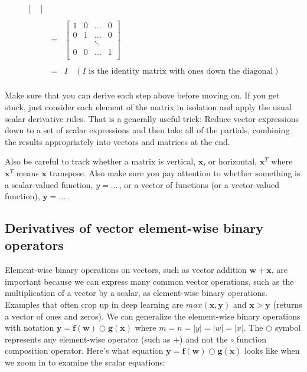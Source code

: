\documentclass[11pt]{article}
\begin{document}
\begin{eqnarray*}
\begin{bmatrix}
\end{bmatrix}\\\\
 & = & \begin{bmatrix}
1 & 0 & \ldots& 0 \\
0 &1 &\ldots & 0 \\
& & \ddots\\
0 & 0 & \ldots &1 \\
\end{bmatrix}\\\\
& = & I ~~~~(I \text{ is the identity matrix with ones down the diagonal})\\
\end{eqnarray*}


Make sure that you can derive each step above before moving on. If you get stuck, just consider each element of the matrix in isolation and apply the usual scalar derivative rules.   That is a generally useful trick: Reduce vector expressions down to a set of scalar expressions and then take all of the partials, combining the results appropriately into vectors and matrices at the end.
 
Also be careful to track whether a matrix is vertical, $\mathbf{x}$, or horizontal, $\mathbf{x}^T$ where $\mathbf{x}^T$ means $\mathbf{x}$ transpose. Also make sure you pay attention to whether something is a scalar-valued function, $y = ...\,$, or a vector of functions (or a vector-valued function), $\mathbf{y} = ...\,$.



\subsection{Derivatives of vector element-wise binary operators}

Element-wise binary operations on vectors, such as vector addition $\mathbf{w} + \mathbf{x}$, are important because we can express many common vector operations, such as the multiplication of a vector by a scalar, as element-wise binary operations.   Examples that often crop up in deep learning are $max(\mathbf{x},\mathbf{y})$ and $\mathbf{x} > \mathbf{y}$ (returns a vector of ones and zeros). We can generalize the element-wise binary operations with notation $\mathbf{y} = \mathbf{f(w)} \bigcirc \mathbf{g(x)}$ where $m=n=|y|=|w|=|x|$. The $\bigcirc$ symbol represents any element-wise operator (such as $+$) and not the $\circ$ function composition operator.  Here's what equation $\mathbf{y} = \mathbf{f(w)} \bigcirc \mathbf{g(x)}$ looks like when we zoom in to examine the scalar equations:
\end{document}
